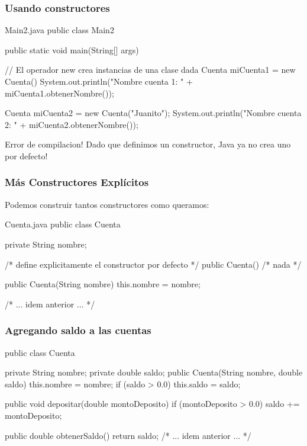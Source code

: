 \documentclass{beamer}
\begin{document}
\begin{frame}[fragile]
  \frametitle{Usando constructores}
    \begin{java}{Main2.java}
      public class Main2 {
        public static void main(String[] args) {
          // El operador new crea instancias de una clase dada
          Cuenta miCuenta1 = new Cuenta()
          System.out.println("Nombre cuenta 1: " +
                              miCuenta1.obtenerNombre());

          Cuenta miCuenta2 = new Cuenta("Juanito");
          System.out.println("Nombre cuenta 2: " +
                              miCuenta2.obtenerNombre());
        }
      }
  \end{java}

  \begin{alertblock}{Error de compilacion!}
    Dado que definimos un constructor, Java ya no crea uno por defecto!
  \end{alertblock}
\end{frame}

\begin{frame}[fragile]
  \frametitle{Más Constructores Explícitos}

  Podemos construir tantos constructores como queramos:
  \begin{java}{Cuenta.java}
    public class Cuenta {
      private String nombre;

      /* define explicitamente
      el constructor por defecto */
      public Cuenta() { /* nada */ } 
      
      public Cuenta(String nombre) {
        this.nombre = nombre;
      }

      /* ... idem anterior ... */
    }
    
  \end{java}
  
\end{frame}

\begin{frame}[fragile]
  \frametitle{Agregando saldo a las cuentas}
  \begin{jsmall}
    public class Cuenta {
      private String nombre;
      private double saldo;
      public Cuenta(String nombre, double saldo) {
        this.nombre = nombre;
        if (saldo > 0.0) {
          this.saldo = saldo;
        }
      }

      public void depositar(double montoDeposito) {
        if (montoDeposito > 0.0) { saldo += montoDeposito; }        
      }

      public double obtenerSaldo() {
        return saldo;
      }
      /* ... idem anterior ... */
    }    
  \end{jsmall}  
\end{frame}
\end{document}
